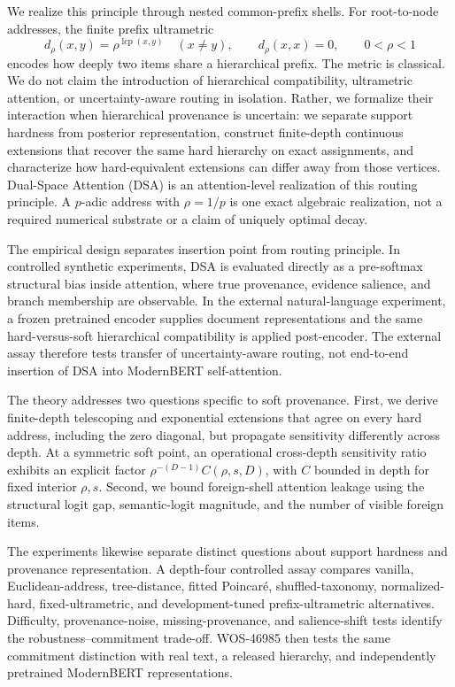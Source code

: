 \documentclass[preprint,11pt]{elsarticle}
\begin{document}
We realize this principle through nested common-prefix shells. For root-to-node addresses, the finite prefix ultrametric
\begin{equation}
 d_\rho(x,y)=\rho^{\operatorname{lcp}(x,y)}\quad(x\neq y),\qquad d_\rho(x,x)=0,\qquad 0<\rho<1
 \label{eq:ultra}
\end{equation}
encodes how deeply two items share a hierarchical prefix. The metric is classical. We do not claim the introduction of hierarchical compatibility, ultrametric attention, or uncertainty-aware routing in isolation. Rather, we formalize their interaction when hierarchical provenance is uncertain: we separate support hardness from posterior representation, construct finite-depth continuous extensions that recover the same hard hierarchy on exact assignments, and characterize how hard-equivalent extensions can differ away from those vertices. Dual-Space Attention (DSA) is an attention-level realization of this routing principle. A $p$-adic address with $\rho=1/p$ is one exact algebraic realization, not a required numerical substrate or a claim of uniquely optimal decay.

The empirical design separates insertion point from routing principle. In controlled synthetic experiments, DSA is evaluated directly as a pre-softmax structural bias inside attention, where true provenance, evidence salience, and branch membership are observable. In the external natural-language experiment, a frozen pretrained encoder supplies document representations and the same hard-versus-soft hierarchical compatibility is applied post-encoder. The external assay therefore tests transfer of uncertainty-aware routing, not end-to-end insertion of DSA into ModernBERT self-attention.

The theory addresses two questions specific to soft provenance. First, we derive finite-depth telescoping and exponential extensions that agree on every hard address, including the zero diagonal, but propagate sensitivity differently across depth. At a symmetric soft point, an operational cross-depth sensitivity ratio exhibits an explicit factor $\rho^{-(D-1)}C(\rho,s,D)$, with $C$ bounded in depth for fixed interior $\rho,s$. Second, we bound foreign-shell attention leakage using the structural logit gap, semantic-logit magnitude, and the number of visible foreign items.

The experiments likewise separate distinct questions about support hardness and provenance representation. A depth-four controlled assay compares vanilla, Euclidean-address, tree-distance, fitted Poincar\'e, shuffled-taxonomy, normalized-hard, fixed-ultrametric, and development-tuned prefix-ultrametric alternatives. Difficulty, provenance-noise, missing-provenance, and salience-shift tests identify the robustness--commitment trade-off. WOS-46985 then tests the same commitment distinction with real text, a released hierarchy, and independently pretrained ModernBERT representations.
\end{document}
